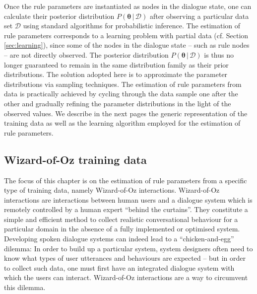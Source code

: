Once the rule parameters are instantiated as nodes in the dialogue state, one can calculate their posterior distribution $P(\boldsymbol\theta \, | \, \mathcal{D})$ after observing a particular data set $\mathcal{D}$ using standard algorithms for probabilistic inference. The estimation of rule parameters corresponds to a learning problem with partial data (cf. Section \ref{sec:learning}), since some of the nodes in the dialogue state  -- such as rule nodes -- are not directly observed. The posterior distribution $P(\boldsymbol\theta \, | \, \mathcal{D})$ is thus no longer guaranteed to remain in the same distribution family as their prior distributions.  The solution adopted here is to approximate the parameter distributions via sampling techniques.
The estimation of rule parameters from data is practically achieved by cycling through the data sample one after the other and gradually refining the parameter distributions in the light of the observed values. We describe in the next pages the generic representation of the training data as well as the learning algorithm employed for the estimation of rule parameters.

\subsection{Wizard-of-Oz training data}
\label{sec:rule-supervised-oz}

The focus of this chapter is on the estimation of rule parameters from a specific type of training data, namely Wizard-of-Oz interactions. Wizard-of-Oz interactions are interactions between human users and a dialogue system which is remotely controlled by a human expert ``behind the curtains''.  They constitute a simple and efficient method to collect realistic conversational behaviour for a particular domain in the absence of a fully implemented or optimised system. Developing spoken dialogue systems can indeed lead to a ``chicken-and-egg'' dilemma: In order to build up a particular system, system designers often need to know what types of user utterances and behaviours are expected -- but in order to collect such data, one must first have an integrated dialogue system with which the users can interact.  Wizard-of-Oz interactions are a way to circumvent this dilemma.


